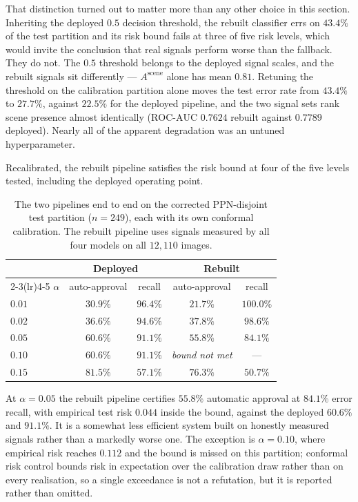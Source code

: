 \documentclass[12pt,a4paper]{report}
\begin{document}
\begin{enumerate}
That distinction turned out to matter more than any other choice in this section. Inheriting the
deployed $0.5$ decision threshold, the rebuilt classifier errs on $43.4\%$ of the test partition
and its risk bound fails at three of five risk levels, which would invite the conclusion that real
signals perform worse than the fallback. They do not. The $0.5$ threshold belongs to the deployed
signal scales, and the rebuilt signals sit differently --- $A^{\text{scene}}$ alone has mean
$0.81$. Retuning the threshold on the calibration partition alone moves the test error rate from
$43.4\%$ to $\mathbf{27.7\%}$, against $22.5\%$ for the deployed pipeline, and the two signal sets
rank scene presence almost identically ($\text{ROC-AUC}$ $0.7624$ rebuilt against $0.7789$
deployed). Nearly all of the apparent degradation was an untuned hyperparameter.

Recalibrated, the rebuilt pipeline satisfies the risk bound at four of the five levels tested,
including the deployed operating point.

\begin{table}[!htbp]
\centering
\caption[Deployed and rebuilt pipelines end to end]{The two pipelines end to end on the corrected PPN-disjoint test partition ($n=249$), each with its own conformal calibration. The rebuilt pipeline uses signals measured by all four models on all $12{,}110$ images.}
\label{tab:end_to_end}
\small
\begin{tabular}{@{}l cc cc@{}}
\toprule
& \multicolumn{2}{c}{\textbf{Deployed}} & \multicolumn{2}{c}{\textbf{Rebuilt}} \\
\cmidrule(lr){2-3}\cmidrule(lr){4-5}
$\alpha$ & auto-approval & recall & auto-approval & recall \\
\midrule
$0.01$ & $30.9\%$ & $96.4\%$ & $21.7\%$ & $100.0\%$ \\
$0.02$ & $36.6\%$ & $94.6\%$ & $37.8\%$ & $98.6\%$ \\
$\mathbf{0.05}$ & $\mathbf{60.6\%}$ & $\mathbf{91.1\%}$ & $\mathbf{55.8\%}$ & $\mathbf{84.1\%}$ \\
$0.10$ & $60.6\%$ & $91.1\%$ & \emph{bound not met} & --- \\
$0.15$ & $81.5\%$ & $57.1\%$ & $76.3\%$ & $50.7\%$ \\
\bottomrule
\end{tabular}
\end{table}

At $\alpha=0.05$ the rebuilt pipeline certifies $55.8\%$ automatic approval at $84.1\%$ error
recall, with empirical test risk $0.044$ inside the bound, against the deployed $60.6\%$ and
$91.1\%$. It is a somewhat less efficient system built on honestly measured signals rather than a
markedly worse one. The exception is $\alpha=0.10$, where empirical risk reaches $0.112$ and the
bound is missed on this partition; conformal risk control bounds risk in expectation over the
calibration draw rather than on every realisation, so a single exceedance is not a refutation, but
it is reported rather than omitted.


\end{enumerate}
\end{document}
